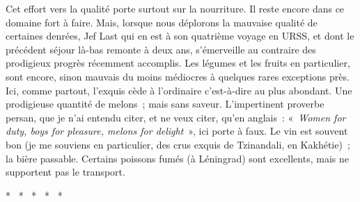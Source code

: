 \documentclass[french,twoside]{book} %
\begin{document}
Cet effort vers la qualité porte surtout sur la nourriture. Il reste encore dans ce domaine fort à faire. Mais, lorsque nous déplorons la mauvaise qualité de certaines denrées, Jef Last qui en est à son quatrième voyage en URSS, et dont le précédent séjour là-bas remonte à deux ans, s’émerveille au contraire des prodigieux progrès récemment accomplis. Les légumes et les fruits en particulier, sont encore, sinon mauvais du moins médiocres à quelques rares exceptions près. Ici, comme partout, l’exquis cède à l’ordinaire c’est-à-dire au plus abondant. Une prodigieuse quantité de melons ; mais sans saveur. L’impertinent proverbe persan, que je n’ai entendu citer, et ne veux citer, qu’en anglais : « \emph{Women for duty, boys for pleasure, melons for delight} », ici porte à faux. Le vin est souvent bon (je me souviens en particulier, des crus exquis de Tzinandali, en Kakhétie) ; la bière passable. Certains poissons fumés (à Léningrad) sont excellents, mais ne supportent pas le transport.\par

\begin{center}
\noindent \centerline{*  *  *  *  *}\par
\end{center}
\end{document}
